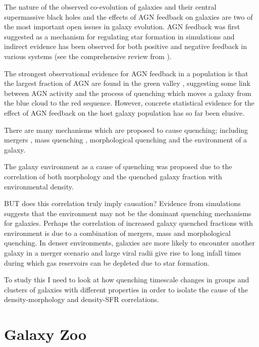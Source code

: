 The nature of the observed co-evolution of galaxies and their central supermassive black holes \citep{magorrian98, marconi03, haringrix04} and the effects of AGN feedback on galaxies are two of the most important open issues in galaxy evolution. AGN feedback was first suggested as a mechanism for regulating star formation in simulations \citep{silk98, Croton06, Bower06, somerville08} and indirect evidence has been observed for both positive and negative feedback in various systems (see the comprehensive review from \citealt{fabian12}). 

The strongest observational evidence for AGN feedback in a population is that the largest fraction of AGN are found in the green valley \citep{cowie08, Hickox09, schawinski10a}, suggesting some link between AGN activity and  the process of quenching which moves a galaxy from the blue cloud to the red sequence. However, concrete statistical evidence for the effect of AGN feedback on the host galaxy population has so far been elusive.

There are many mechanisms which are proposed to cause quenching; including mergers \citep{daddi10}, mass quenching \citep{kennicutt87, peng12}, morphological quenching \citep{?} and the environment of a galaxy.
 
 The galaxy environment as a cause of quenching was proposed due to the correlation of both morphology \citep{dressler80} and the quenched galaxy fraction \citep{?} with environmental density. 
 
 BUT does this correlation truly imply causation? Evidence from simulations \citep{?} suggests that the environment may not be the dominant quenching mechanisms for galaxies. Perhaps the correlation of increased galaxy quenched fractions with environment is due to a combination of mergers, mass and morphological quenching. In denser environments, galaxies are more likely to encounter another galaxy in a merger scenario and large viral radii give rise to long infall times during which gas reservoirs can be depleted due to star formation.
 
 To study this I need to look at how quenching timescale changes in groups and clusters of galaxies with different properties in order to isolate the cause of the density-morphology and density-SFR correlations. 

\section{Galaxy Zoo}\label{class}

